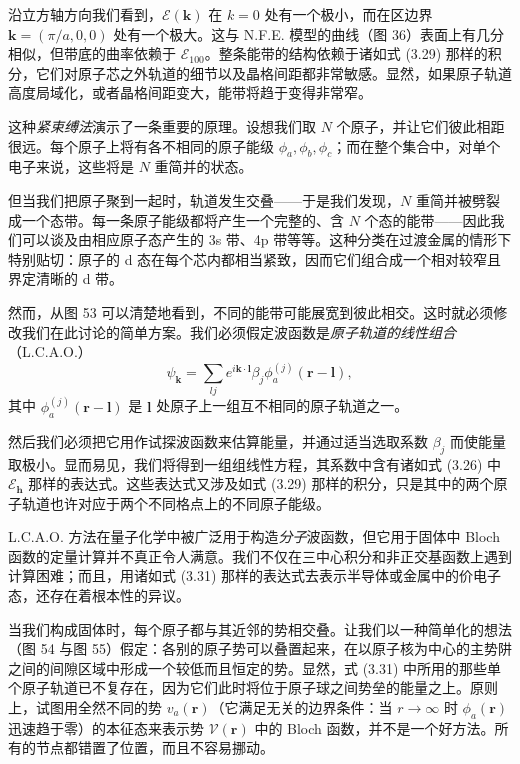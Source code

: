 沿立方轴方向我们看到，$\mathcal{E}(\mathbf{k})$ 在 $k=0$ 处有一个极小，而在区边界 $\mathbf{k}=(\pi/a,0,0)$ 处有一个极大。这与 N.F.E. 模型的曲线（图 36）表面上有几分相似，但带底的曲率依赖于 $\mathcal{E}_{100}$。整条能带的结构依赖于诸如式 (3.29) 那样的积分，它们对原子芯之外轨道的细节以及晶格间距都非常敏感。显然，如果原子轨道高度局域化，或者晶格间距变大，能带将趋于变得非常窄。

这种\emph{紧束缚法}演示了一条重要的原理。设想我们取 $N$ 个原子，并让它们彼此相距很远。每个原子上将有各不相同的原子能级 $\phi_a,\phi_b,\phi_c$；而在整个集合中，对单个电子来说，这些将是 $N$ 重简并的状态。


但当我们把原子聚到一起时，轨道发生交叠——于是我们发现，$N$ 重简并被劈裂成一个态带。每一条原子能级都将产生一个完整的、含 $N$ 个态的能带——因此我们可以谈及由相应原子态产生的 3s 带、4p 带等等。这种分类在过渡金属的情形下特别贴切：原子的 d 态在每个芯内都相当紧致，因而它们组合成一个相对较窄且界定清晰的 d 带。

然而，从图 53 可以清楚地看到，不同的能带可能展宽到彼此相交。这时就必须修改我们在此讨论的简单方案。我们必须假定波函数是\emph{原子轨道的线性组合}（L.C.A.O.）
\begin{equation*}
\psi_{\mathbf{k}}=\sum_{lj}e^{i\mathbf{k}\cdot\mathbf{l}}\beta_j\phi_a^{(j)}(\mathbf{r}-\mathbf{l}),
\tag{3.31}
\end{equation*}
其中 $\phi_a^{(j)}(\mathbf{r}-\mathbf{l})$ 是 $\mathbf{l}$ 处原子上一组互不相同的原子轨道之一。

然后我们必须把它用作试探波函数来估算能量，并通过适当选取系数 $\beta_j$ 而使能量取极小。显而易见，我们将得到一组组线性方程，其系数中含有诸如式 (3.26) 中 $\mathcal{E}_{\mathbf{h}}$ 那样的表达式。这些表达式又涉及如式 (3.29) 那样的积分，只是其中的两个原子轨道也许对应于两个不同格点上的不同原子能级。

L.C.A.O. 方法在量子化学中被广泛用于构造\emph{分子}波函数，但它用于固体中 Bloch 函数的定量计算并不真正令人满意。我们不仅在三中心积分和非正交基函数上遇到计算困难；而且，用诸如式 (3.31) 那样的表达式去表示半导体或金属中的价电子态，还存在着根本性的异议。

当我们构成固体时，每个原子都与其近邻的势相交叠。让我们以一种简单化的想法（图 54 与图 55）假定：各别的原子势可以叠置起来，在以原子核为中心的主势阱之间的间隙区域中形成一个较低而且恒定的势。显然，式 (3.31) 中所用的那些单个原子轨道已不复存在，因为它们此时将位于原子球之间势垒的能量之上。原则上，试图用全然不同的势 $v_a(\mathbf{r})$（它满足无关的边界条件：当 $r\to\infty$ 时 $\phi_a(\mathbf{r})$ 迅速趋于零）的本征态来表示势 $\mathcal{V}(\mathbf{r})$ 中的 Bloch 函数，并不是一个好方法。所有的节点都错置了位置，而且不容易挪动。

